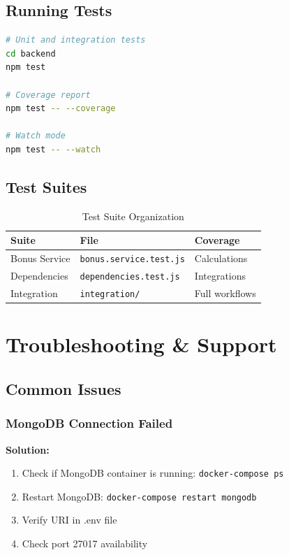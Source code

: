 \documentclass[11pt,a4paper,oneside,openany]{book}
\newcommand{\code}[1]{\texttt{\small #1}}
\begin{document}
\section{Running Tests}

\begin{lstlisting}[language=bash,caption=Test Execution]
# Unit and integration tests
cd backend
npm test

# Coverage report
npm test -- --coverage

# Watch mode
npm test -- --watch
\end{lstlisting}

\section{Test Suites}

\begin{table}[H]
\centering
\begin{tabular}{lll}
\toprule
\textbf{Suite} & \textbf{File} & \textbf{Coverage} \\
\midrule
Bonus Service & \code{bonus.service.test.js} & Calculations \\
Dependencies & \code{dependencies.test.js} & Integrations \\
Integration & \code{integration/} & Full workflows \\
\bottomrule
\end{tabular}
\caption{Test Suite Organization}
\end{table}

\chapter{Troubleshooting \& Support}

\section{Common Issues}

\subsection{MongoDB Connection Failed}

\begin{tcolorbox}[colback=orange!5!white,colframe=orange,title=Issue: Cannot Connect to MongoDB]
\textbf{Solution:}
\begin{enumerate}
    \item Check if MongoDB container is running: \code{docker-compose ps}
    \item Restart MongoDB: \code{docker-compose restart mongodb}
    \item Verify URI in .env file
    \item Check port 27017 availability
\end{enumerate}
\end{tcolorbox}
\end{document}

